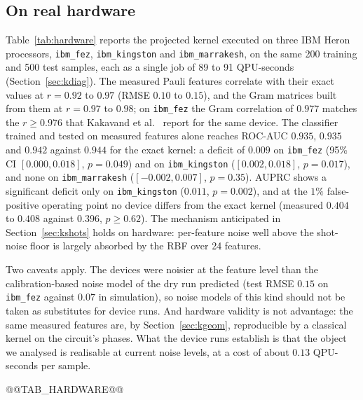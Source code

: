 \subsection{On real hardware}\label{sec:khw}
Table~\ref{tab:hardware} reports the projected kernel executed on three IBM Heron processors,
\texttt{ibm\_fez}, \texttt{ibm\_kingston} and \texttt{ibm\_marrakesh}, on the same 200 training and 500
test samples, each as a single job of 89 to 91 QPU-seconds (Section~\ref{sec:kdiag}). The measured Pauli
features correlate with their exact values at $r=0.92$ to $0.97$ (RMSE $0.10$ to $0.15$), and the Gram
matrices built from them at $r=0.97$ to $0.98$; on \texttt{ibm\_fez} the Gram correlation of $0.977$
matches the $r\ge0.976$ that Kakavand et al.~\cite{kakavand2026benchmarking} report for the same device.
The classifier trained and tested on measured features alone reaches ROC-AUC $0.935$, $0.935$ and $0.942$
against $0.944$ for the exact kernel: a deficit of $0.009$ on \texttt{ibm\_fez} (95\% CI $[0.000,0.018]$,
$p=0.049$) and on \texttt{ibm\_kingston} ($[0.002,0.018]$, $p=0.017$), and none on \texttt{ibm\_marrakesh}
($[-0.002,0.007]$, $p=0.35$). AUPRC shows a significant deficit only on \texttt{ibm\_kingston} ($0.011$,
$p=0.002$), and at the $1\%$ false-positive operating point no device differs from the exact kernel
(measured $0.404$ to $0.408$ against $0.396$, $p\ge0.62$). The mechanism anticipated in
Section~\ref{sec:kshots} holds on hardware: per-feature noise well above the shot-noise floor is largely
absorbed by the RBF over 24 features.

Two caveats apply. The devices were noisier at the feature level than the calibration-based noise model
of the dry run predicted (test RMSE $0.15$ on \texttt{ibm\_fez} against $0.07$ in simulation), so noise
models of this kind should not be taken as substitutes for device runs. And hardware validity is not
advantage: the same measured features are, by Section~\ref{sec:kgeom}, reproducible by a classical kernel
on the circuit's phases. What the device runs establish is that the object we analysed is realisable at
current noise levels, at a cost of about $0.13$ QPU-seconds per sample.

@@TAB_HARDWARE@@
